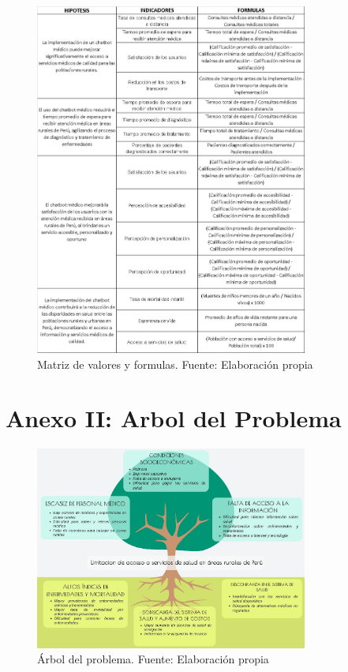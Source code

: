 	\begin{figure}[h]
		\begin{center}
			\includegraphics[width=0.8\textwidth]{images_repo/Matriz de consistencia.jpeg}
			\caption{Matriz de valores y formulas. Fuente: Elaboración propia}
			\label{1:fig}
		\end{center}
	\end{figure}



\chapter{Anexo II: Arbol del Problema}

\begin{figure}[h]
	\begin{center}
		\includegraphics[width=0.8\textwidth]{images_repo/Arbol del problema.jpeg}
		\caption{Árbol del problema. Fuente: Elaboración propia}
		\label{1:fig}
	\end{center}
\end{figure}

